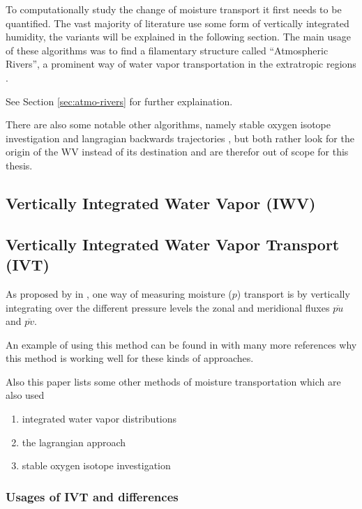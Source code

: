 To computationally study the change of moisture transport it first needs to be quantified. 
The vast majority of literature use some form of vertically integrated humidity, the variants will be explained in the following section.  
The main usage of these algorithms was to find a filamentary structure called \enquote{Atmospheric Rivers}, a prominent way of water vapor transportation in the extratropic regions \cite{gimeno_atmospheric_2014}. 

See Section \ref{sec:atmo-rivers} for further explaination. 


There are also some notable other algorithms, namely stable oxygen isotope investigation \cite{ma_atmospheric_nodate} and langragian backwards trajectories \cite{zhao_lagrangian_2021}, but both rather look for the origin of the WV instead of its destination and are therefor out of scope for this thesis.

\subsection{Vertically Integrated Water Vapor (IWV)}

\subsection{Vertically Integrated Water Vapor Transport (IVT)}

As proposed by \citeauthor{zhu_proposed_1998} in \cite{zhu_proposed_1998}, one way of measuring moisture ($p$) transport is by vertically integrating over the different pressure levels the zonal and meridional fluxes $\overline{pu}$ and $\overline{pv}$. 

An example of using this method can be found in \cite{ayantobo_integrated_2022} with many more references why this method is working well for these kinds of approaches. 

Also this paper lists some other methods of moisture transportation which are also used

\begin{enumerate}
  \item integrated water vapor distributions
  \item the lagrangian approach
  \item stable oxygen isotope investigation
\end{enumerate}

\subsubsection{Usages of IVT and differences}

